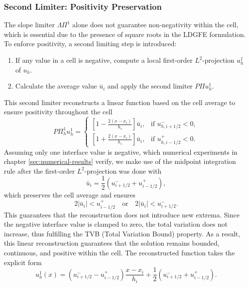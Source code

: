 \documentclass[a4paper,12pt]{paper}
\begin{document}
\subsubsection{Second Limiter: Positivity Preservation}

The slope limiter $ \Lambda\Pi^1 $ alone does not guarantee non-negativity within the cell, which is essential due to the presence of square roots in the LDGFE formulation. To enforce positivity, a second limiting step is introduced:
\begin{enumerate}
	\item If any value in a cell is negative, compute a local first-order $L^2$-projection $u_h^1$ of $u_h$.
	\item Calculate the average value $\bar{u}_i$ and apply the second limiter $P\Pi u_h^1$.
\end{enumerate}
This second limiter reconstructs a linear function based on the cell average to ensure positivity throughout the cell
\begin{equation*}
	P \Pi^1_h u_h^1 = 
	\begin{cases}
		\left[1 - \frac{2(x - x_i)}{h_i} \right] \bar{u}_i, & \text{if } u_{h, i+1/2}^{-} < 0, \\
		\left[1 + \frac{2(x - x_i)}{h_i} \right] \bar{u}_i, & \text{if } u_{h, i-1/2}^{+} < 0.
	\end{cases}
\end{equation*}
Assuming only one interface value is negative, which numerical experiments in chapter \ref{sec:numerical-results} verify, we make use of the midpoint integration rule after the first-order $ L^2$-projection was done with
\[
\bar{u}_i = \frac{1}{2} \left( u_{i+1/2}^{-} + u_{i-1/2}^{+} \right),
\]
which preserves the cell average and ensures
\[
2|\bar{u}_i| < u_{i-1/2}^{+} \quad \text{or} \quad 2|\bar{u}_i| < u_{i+1/2}^{-}.
\] 
This guarantees that the reconstruction does not introduce new extrema. Since the negative interface value is clamped to zero, the total variation does not increase, thus fulfilling the TVB (Total Variation Bound) property.
As a result, this linear reconstruction guarantees that the solution remains bounded, continuous, and positive within the cell. The reconstructed function takes the explicit form
\begin{equation*}
	u^1_h(x) = \left( u_{i+1/2}^{-} - u_{i-1/2}^{+} \right) \frac{x - x_i}{h_i} + \frac{1}{2} \left( u_{i+1/2}^{-} + u_{i-1/2}^{+} \right).
\end{equation*}
\end{document}
